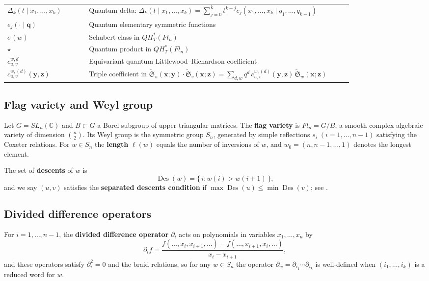 \documentclass[12pt]{amsart}
\begin{document}
\begin{center}
\begin{tabular}{p{0.22\linewidth}p{0.71\linewidth}}
\addlinespace
$\Delta_k(t\mid x_1,\ldots,x_k)$ & Quantum delta: $\displaystyle\Delta_k(t\mid x_1,\ldots,x_k) = \sum_{j=0}^k t^{k-j}e_j(x_1,\ldots,x_k\mid q_1,\ldots,q_{k-1})$ \\
\addlinespace
$e_j(\cdot\mid\mathbf{q})$ & Quantum elementary symmetric functions \\
\addlinespace
$\sigma(w)$ & Schubert class in $QH_T^*(Fl_n)$ \\
\addlinespace
$\star$ & Quantum product in $QH_T^*(Fl_n)$ \\
\addlinespace
$c_{u,v}^{w,d}$ & Equivariant quantum Littlewood--Richardson coefficient \\
\addlinespace
$c_{u,v}^{w,(d)}(\mathbf{y},\mathbf{z})$ & Triple coefficient in $\widetilde{\mathfrak{S}}_u(\mathbf{x};\mathbf{y})\cdot\widetilde{\mathfrak{S}}_v(\mathbf{x};\mathbf{z}) = \sum_{d,w} q^d\,c_{u,v}^{w,(d)}(\mathbf{y},\mathbf{z})\,\widetilde{\mathfrak{S}}_w(\mathbf{x};\mathbf{z})$ \\
\bottomrule
\end{tabular}
\end{center}

\subsection{Flag variety and Weyl group}
Let $G = SL_n(\mathbb{C})$ and $B\subset G$ a Borel subgroup of upper triangular matrices.
The \textbf{flag variety} is $Fl_n = G/B$, a smooth complex algebraic variety of dimension $\binom{n}{2}$.
Its Weyl group is the symmetric group $S_n$, generated by simple reflections
$s_i\;(i=1,\ldots,n-1)$ satisfying the Coxeter relations.
For $w\in S_n$ the \textbf{length} $\ell(w)$ equals the number of inversions of $w$,
and $w_0 = (n,n-1,\ldots,1)$ denotes the longest element.

The set of \textbf{descents} of $w$ is
\[
\operatorname{Des}(w) = \{\, i : w(i)>w(i+1) \,\},
\label{eq:DesSet}
\]
and we say $(u,v)$ satisfies the \textbf{separated descents condition} if
$\max\operatorname{Des}(u)\le \min\operatorname{Des}(v)$; see \cite[Definition 2.1]{Sa}.

\subsection{Divided difference operators}
For $i=1,\ldots,n-1$, the \textbf{divided difference operator} $\partial_i$ acts on polynomials
in variables $x_1,\ldots,x_n$ by
\[
\partial_i f = \frac{f(\ldots,x_i,x_{i+1},\ldots)-f(\ldots,x_{i+1},x_i,\ldots)}{x_i-x_{i+1}},
\label{eq:DividedDifference}
\]
and these operators satisfy $\partial_i^2=0$ and the braid relations, so for any $w\in S_n$
the operator $\partial_w = \partial_{i_1}\cdots\partial_{i_k}$ is well-defined when
$(i_1,\ldots,i_k)$ is a reduced word for $w$.
\end{document}
